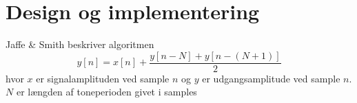 \section{Design og implementering}


Jaffe \& Smith beskriver algoritmen
\begin{equation}
  y[n] = x[n] + \frac{y[n - N] + y\left[n -(N + 1)\right]}{2}
\end{equation}
hvor \(x\) er signalamplituden ved sample \(n\) og \(y\) er udgangsamplitude ved sample \(n\).
\(N\) er længden af toneperioden givet i samples \cite{Jaffe1983}
